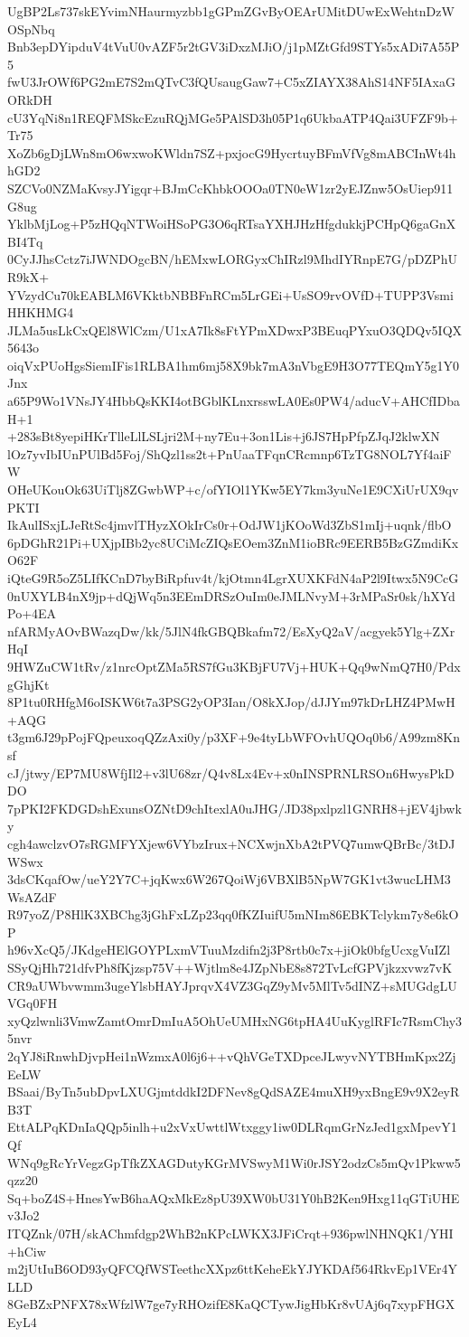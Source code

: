 UgBP2Ls737skEYvimNHaurmyzbb1gGPmZGvByOEArUMitDUwExWehtnDzWOSpNbq
Bnb3epDYipduV4tVuU0vAZF5r2tGV3iDxzMJiO/j1pMZtGfd9STYs5xADi7A55P5
fwU3JrOWf6PG2mE7S2mQTvC3fQUsaugGaw7+C5xZIAYX38AhS14NF5IAxaGORkDH
cU3YqNi8n1REQFMSkcEzuRQjMGe5PAlSD3h05P1q6UkbaATP4Qai3UFZF9b+Tr75
XoZb6gDjLWn8mO6wxwoKWldn7SZ+pxjocG9HycrtuyBFmVfVg8mABCInWt4hhGD2
SZCVo0NZMaKvsyJYigqr+BJmCcKhbkOOOa0TN0eW1zr2yEJZnw5OsUiep911G8ug
YklbMjLog+P5zHQqNTWoiHSoPG3O6qRTsaYXHJHzHfgdukkjPCHpQ6gaGnXBI4Tq
0CyJJhsCctz7iJWNDOgcBN/hEMxwLORGyxChIRzl9MhdIYRnpE7G/pDZPhUR9kX+
YVzydCu70kEABLM6VKktbNBBFnRCm5LrGEi+UsSO9rvOVfD+TUPP3VsmiHHKHMG4
JLMa5usLkCxQEl8WlCzm/U1xA7Ik8sFtYPmXDwxP3BEuqPYxuO3QDQv5IQX5643o
oiqVxPUoHgsSiemIFis1RLBA1hm6mj58X9bk7mA3nVbgE9H3O77TEQmY5g1Y0Jnx
a65P9Wo1VNsJY4HbbQsKKI4otBGblKLnxrsswLA0Es0PW4/aducV+AHCfIDbaH+1
+283sBt8yepiHKrTlleLlLSLjri2M+ny7Eu+3on1Lis+j6JS7HpPfpZJqJ2klwXN
lOz7yvIbIUnPUlBd5Foj/ShQzl1ss2t+PnUaaTFqnCRcmnp6TzTG8NOL7Yf4aiFW
OHeUKouOk63UiTlj8ZGwbWP+c/ofYIOl1YKw5EY7km3yuNe1E9CXiUrUX9qvPKTI
IkAulISxjLJeRtSc4jmvlTHyzXOkIrCs0r+OdJW1jKOoWd3ZbS1mIj+uqnk/flbO
6pDGhR21Pi+UXjpIBb2yc8UCiMcZIQsEOem3ZnM1ioBRc9EERB5BzGZmdiKxO62F
iQteG9R5oZ5LIfKCnD7byBiRpfuv4t/kjOtmn4LgrXUXKFdN4aP2l9Itwx5N9CcG
0nUXYLB4nX9jp+dQjWq5n3EEmDRSzOuIm0eJMLNvyM+3rMPaSr0sk/hXYdPo+4EA
nfARMyAOvBWazqDw/kk/5JlN4fkGBQBkafm72/EsXyQ2aV/acgyek5Ylg+ZXrHqI
9HWZuCW1tRv/z1nrcOptZMa5RS7fGu3KBjFU7Vj+HUK+Qq9wNmQ7H0/PdxgGhjKt
8P1tu0RHfgM6oISKW6t7a3PSG2yOP3Ian/O8kXJop/dJJYm97kDrLHZ4PMwH+AQG
t3gm6J29pPojFQpeuxoqQZzAxi0y/p3XF+9e4tyLbWFOvhUQOq0b6/A99zm8Knsf
cJ/jtwy/EP7MU8WfjIl2+v3lU68zr/Q4v8Lx4Ev+x0nINSPRNLRSOn6HwysPkDDO
7pPKI2FKDGDshExunsOZNtD9chItexlA0uJHG/JD38pxlpzl1GNRH8+jEV4jbwky
cgh4awclzvO7sRGMFYXjew6VYbzIrux+NCXwjnXbA2tPVQ7umwQBrBc/3tDJWSwx
3dsCKqafOw/ueY2Y7C+jqKwx6W267QoiWj6VBXlB5NpW7GK1vt3wucLHM3WsAZdF
R97yoZ/P8HlK3XBChg3jGhFxLZp23qq0fKZIuifU5mNIm86EBKTclykm7y8e6kOP
h96vXcQ5/JKdgeHElGOYPLxmVTuuMzdifn2j3P8rtb0c7x+jiOk0bfgUcxgVuIZl
SSyQjHh721dfvPh8fKjzsp75V++Wjtlm8e4JZpNbE8s872TvLcfGPVjkzxvwz7vK
CR9aUWbvwmm3ugeYlsbHAYJprqvX4VZ3GqZ9yMv5MlTv5dINZ+sMUGdgLUVGq0FH
xyQzlwnli3VmwZamtOmrDmIuA5OhUeUMHxNG6tpHA4UuKyglRFIc7RsmChy35nvr
2qYJ8iRnwhDjvpHei1nWzmxA0l6j6++vQhVGeTXDpceJLwyvNYTBHmKpx2ZjEeLW
BSaai/ByTn5ubDpvLXUGjmtddkI2DFNev8gQdSAZE4muXH9yxBngE9v9X2eyRB3T
EttALPqKDnIaQQp5inlh+u2xVxUwttlWtxggy1iw0DLRqmGrNzJed1gxMpevY1Qf
WNq9gRcYrVegzGpTfkZXAGDutyKGrMVSwyM1Wi0rJSY2odzCs5mQv1Pkww5qzz20
Sq+boZ4S+HnesYwB6haAQxMkEz8pU39XW0bU31Y0hB2Ken9Hxg11qGTiUHEv3Jo2
ITQZnk/07H/skAChmfdgp2WhB2nKPcLWKX3JFiCrqt+936pwlNHNQK1/YHI+hCiw
m2jUtIuB6OD93yQFCQfWSTeethcXXpz6ttKeheEkYJYKDAf564RkvEp1VEr4YLLD
8GeBZxPNFX78xWfzlW7ge7yRHOzifE8KaQCTywJigHbKr8vUAj6q7xypFHGXEyL4
